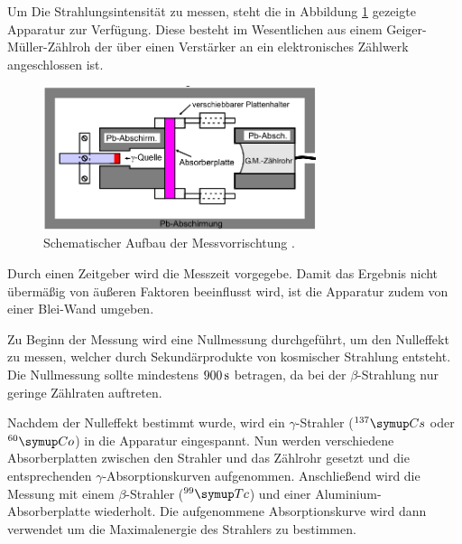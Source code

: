 Um Die Strahlungsintensität zu messen, steht die in Abbildung \ref{aufbau}
gezeigte Apparatur zur Verfügung. Diese besteht im Wesentlichen aus einem
Geiger-Müller-Zählroh der über einen Verstärker an ein elektronisches
Zählwerk angeschlossen ist.
\begin{figure}[H]
  \centering
  \includegraphics[width=8cm]{bilder/app.jpg}
  \caption{Schematischer Aufbau der Messvorrischtung \cite{704}.}
  \label{aufbau}
\end{figure}
\noindent
Durch einen Zeitgeber wird die Messzeit vorgegebe. Damit das Ergebnis nicht
übermäßig von äußeren Faktoren beeinflusst wird, ist die Apparatur zudem von einer
Blei-Wand umgeben.

\noindent
Zu Beginn der Messung wird eine Nullmessung durchgeführt, um den Nulleffekt zu
messen, welcher durch Sekundärprodukte von kosmischer Strahlung entsteht. Die
Nullmessung sollte mindestens $900\,\si{\second}$ betragen, da bei der $\beta$-Strahlung
nur geringe Zählraten auftreten.

\noindent
Nachdem der Nulleffekt bestimmt wurde, wird ein $\gamma$-Strahler ($^{137}\su{Cs}$
oder $^{60}\su{Co}$) in die Apparatur eingespannt. Nun werden verschiedene
Absorberplatten zwischen den Strahler und das Zählrohr gesetzt und die entsprechenden
$\gamma$-Absorptionskurven aufgenommen.
Anschließend wird die Messung mit einem $\beta$-Strahler ($^{99}\su{Tc}$) und einer
Aluminium-Absorberplatte wiederholt. Die aufgenommene Absorptionskurve wird dann
verwendet um die Maximalenergie des Strahlers zu bestimmen.
